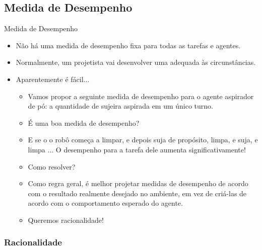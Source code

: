 \documentclass{libs/ufc_format}
\begin{document}
\subsection{Medida de Desempenho}

\begin{frame}{Medida de Desempenho}
    \begin{itemize}
        \justifying
        \item Não há uma medida de desempenho fixa para todas as tarefas e agentes.
        \item Normalmente, um projetista vai desenvolver uma adequada às circunstâncias.
        \item Aparentemente é fácil...
            \begin{itemize}
                \justifying
                \item<2-> Vamos propor a seguinte medida de desempenho para o agente aspirador de pó: a quantidade de sujeira aspirada em um único turno.
                \item<2> É uma boa medida de desempenho?
                \item<3> E se o o robô começa a limpar, e depois suja de propósito, limpa, e suja, e limpa ... O desempenho para a tarefa dele aumenta significativamente!
                \item<3> Como resolver?
                \item<4> Como regra geral, é melhor projetar medidas de desempenho de acordo com o resultado realmente desejado no ambiente, em vez de criá-las de acordo com o comportamento esperado do agente.
                \item<4> Queremos racionalidade!
            \end{itemize}
    \end{itemize}
\end{frame}

\subsubsection{Racionalidade}
\end{document}
